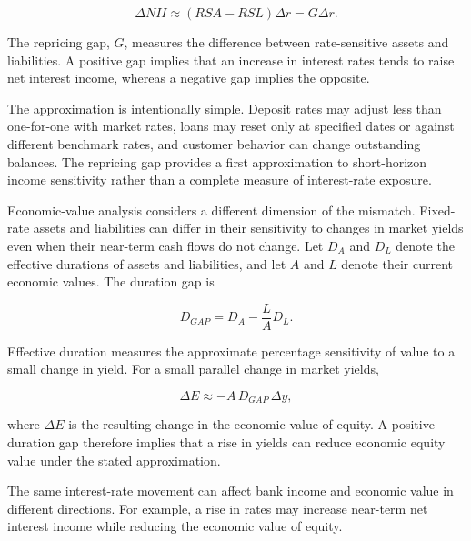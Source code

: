 \begin{equation}
\Delta \textit{NII}\approx (\textit{RSA}-\textit{RSL})\Delta r
=G\Delta r.
\label{eq:ch12-net-interest-income-gap}
\end{equation}

The repricing gap, $G$, measures the difference between
rate-sensitive assets and liabilities. A positive gap implies
that an increase in interest rates tends to raise net interest
income, whereas a negative gap implies the opposite.

The approximation is intentionally simple. Deposit rates may adjust less than one-for-one with market rates, loans may reset only at specified dates or against different benchmark rates, and customer behavior can change outstanding balances. The repricing gap provides a first approximation to short-horizon income sensitivity rather than a complete measure of interest-rate exposure.

Economic-value analysis considers a different dimension of the mismatch. Fixed-rate assets and liabilities can differ in their sensitivity to changes in market yields even when their near-term cash flows do not change. Let $D_A$ and $D_L$ denote the effective durations of assets and liabilities, and let $A$ and $L$ denote their current economic values. The duration gap is

\begin{equation}
D_{GAP}=D_A-\frac{L}{A}D_L.
\label{eq:ch12-duration-gap}
\end{equation}

Effective duration measures the approximate percentage sensitivity of value to a small change in yield. For a small parallel change in market yields,

\begin{equation}
\Delta E\approx -A\,D_{GAP}\,\Delta y,
\label{eq:ch12-duration-gap-equity}
\end{equation}

where $\Delta E$ is the resulting change in the economic value of equity. A positive duration gap therefore implies that a rise in yields can reduce economic equity value under the stated approximation.

\begin{tcolorbox}[
  enhanced,
  breakable,
  colback=white,
  colframe=FinanceBlue,
  boxrule=0.7pt,
  sharp corners,
  borderline west={2.2pt}{0pt}{FinanceBlue},
  title=\textbf{Financial Perspective: Income and Economic-Value Effects Can Differ},
  coltitle=white,
  colbacktitle=FinanceBlue,
  fonttitle=\bfseries,
  before skip=1.2em,
  after skip=1.2em
]

The same interest-rate movement can affect bank income and economic value in different directions. For example, a rise in rates may increase near-term net interest income while reducing the economic value of equity.

\end{tcolorbox}

